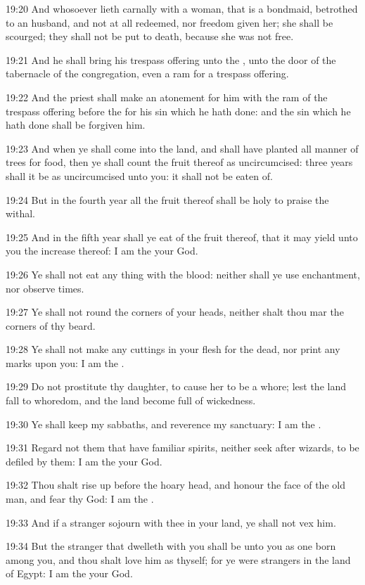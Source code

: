 19:20 And whosoever lieth carnally with a woman, that is a bondmaid,
betrothed to an husband, and not at all redeemed, nor freedom given
her; she shall be scourged; they shall not be put to death, because
she was not free.

19:21 And he shall bring his trespass offering unto the \LORD, unto the
door of the tabernacle of the congregation, even a ram for a trespass
offering.

19:22 And the priest shall make an atonement for him with the ram of
the trespass offering before the \LORD for his sin which he hath done:
and the sin which he hath done shall be forgiven him.

19:23 And when ye shall come into the land, and shall have planted all
manner of trees for food, then ye shall count the fruit thereof as
uncircumcised: three years shall it be as uncircumcised unto you: it
shall not be eaten of.

19:24 But in the fourth year all the fruit thereof shall be holy to
praise the \LORD withal.

19:25 And in the fifth year shall ye eat of the fruit thereof, that it
may yield unto you the increase thereof: I am the \LORD your God.

19:26 Ye shall not eat any thing with the blood: neither shall ye use
enchantment, nor observe times.

19:27 Ye shall not round the corners of your heads, neither shalt thou
mar the corners of thy beard.

19:28 Ye shall not make any cuttings in your flesh for the dead, nor
print any marks upon you: I am the \LORD.

19:29 Do not prostitute thy daughter, to cause her to be a whore; lest
the land fall to whoredom, and the land become full of wickedness.

19:30 Ye shall keep my sabbaths, and reverence my sanctuary: I am the
\LORD.

19:31 Regard not them that have familiar spirits, neither seek after
wizards, to be defiled by them: I am the \LORD your God.

19:32 Thou shalt rise up before the hoary head, and honour the face of
the old man, and fear thy God: I am the \LORD.

19:33 And if a stranger sojourn with thee in your land, ye shall not
vex him.

19:34 But the stranger that dwelleth with you shall be unto you as one
born among you, and thou shalt love him as thyself; for ye were
strangers in the land of Egypt: I am the \LORD your God.

